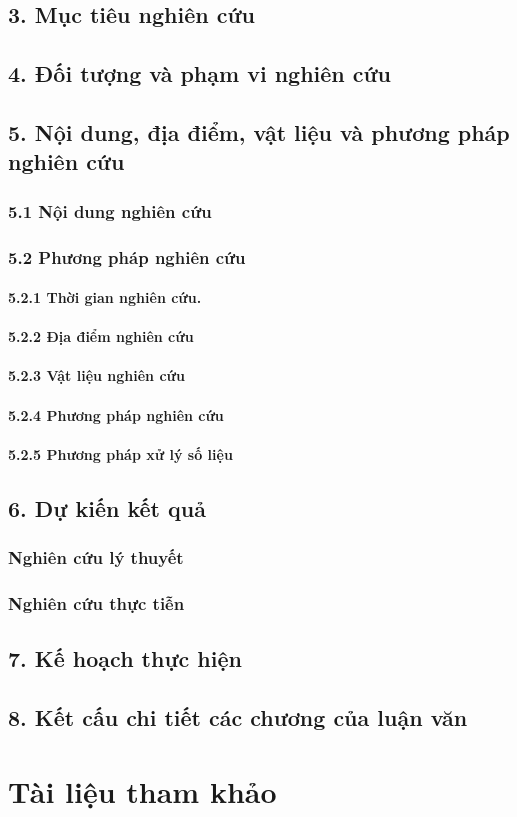 \documentclass[12pt,a4paper]{report}
\begin{document}
\section*{3. Mục tiêu nghiên cứu}
\section*{4. Đối tượng và phạm vi nghiên cứu}
\section*{5. Nội dung, địa điểm, vật liệu và phương pháp nghiên cứu}
	\subsection*{5.1 Nội dung nghiên cứu}
	\subsection*{5.2 Phương pháp nghiên cứu}
		\subsubsection*{5.2.1 Thời gian nghiên cứu.}
		\subsubsection*{5.2.2 Địa  điểm nghiên cứu}
		\subsubsection*{5.2.3 Vật liệu nghiên cứu }
		\subsubsection*{5.2.4 Phương pháp nghiên cứu}
		\subsubsection*{5.2.5 Phương pháp xử lý số liệu}
\section*{6. Dự kiến kết quả}
	\subsection*{Nghiên cứu  lý thuyết}
	\subsection*{Nghiên cứu thực tiễn}
\section*{7. Kế hoạch thực hiện}
\section*{8. Kết cấu chi tiết các chương của luận văn}
\chapter*{Tài liệu tham khảo}



\end{document}
